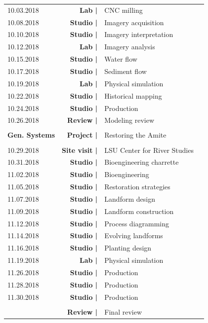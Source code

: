 \documentclass[11pt,article,oneside]{memoir}
\begin{document}
\begin{table}[H]
\begin{tabular}{l r @{\hskip 0.1cm} l @{\hskip 0.5cm} l}
10.03.2018 & \textbf{Lab |} & CNC milling \\
%
10.08.2018 & \textbf{Studio |} & Imagery acquisition\\ 
10.10.2018 & \textbf{Studio |} & Imagery interpretation \\ 
10.12.2018 & \textbf{Lab |} & Imagery analysis \\  
%
10.15.2018 & \textbf{Studio |} & Water flow \\
10.17.2018 & \textbf{Studio |} & Sediment flow \\
10.19.2018 & \textbf{Lab |} & Physical simulation \\
%
10.22.2018 & \textbf{Studio |} & Historical mapping \\
10.24.2018 & \textbf{Studio |} & Production \\
10.26.2018 & \textbf{Review |} & Modeling review \\
\\
\textbf{Gen. Systems} & \textbf{Project |} & Restoring the Amite \\
\\
10.29.2018 & \textbf{Site visit |} & LSU Center for River Studies \\
10.31.2018 & \textbf{Studio |} & Bioengineering charrette \\
11.02.2018 & \textbf{Studio |} & Bioengineering \\
%
11.05.2018 & \textbf{Studio |} & Restoration strategies \\
11.07.2018 & \textbf{Studio |} & Landform design \\
11.09.2018 & \textbf{Studio |} & Landform construction \\
%
11.12.2018 & \textbf{Studio |} & Process diagramming \\
11.14.2018 & \textbf{Studio |} & Evolving landforms \\
11.16.2018 & \textbf{Studio |} & Planting design \\
%
11.19.2018 & \textbf{Lab |} & Physical simulation \\
%
11.26.2018 & \textbf{Studio |} & Production \\
11.28.2018 & \textbf{Studio |} & Production \\ 
11.30.2018 & \textbf{Studio |} & Production \\
\\
& \textbf{Review |} & Final review \\
%
\end{tabular}
\end{table}
\end{document}
